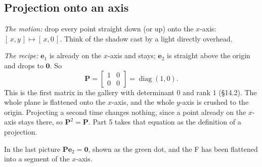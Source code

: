 \documentclass[11pt]{article}
\theoremstyle{plain}
\theoremstyle{definition}
\theoremstyle{remark}
\newcommand{\vc}[1]{\mathbf{#1}}
\newcommand{\mt}[1]{\mathbf{#1}}
\DeclareMathOperator{\diagop}{diag}
\newcommand{\Fshape}{(0.15,0.1) -- (0.35,0.1) -- (0.35,0.45) -- (0.65,0.45)
  -- (0.65,0.6) -- (0.35,0.6) -- (0.35,0.75) -- (0.8,0.75) -- (0.8,0.9)
  -- (0.15,0.9) -- cycle}
\newcommand{\actionpic}[4]{%
  \begin{scope}
    \clip (-2.2,-2.2) rectangle (2.4,2.4);
    \draw[step=1cm,gray!22,very thin] (-3,-3) grid (3,3);
  \end{scope}
  \draw[axisline] (-2.2,0) -- (2.6,0);
  \draw[axisline] (0,-2.2) -- (0,2.6);
  \draw[gray!55,dashed] (0,0) -- (1,0) -- (1,1) -- (0,1) -- cycle;
  \fill[gray!30] \Fshape;
  \begin{scope}[cm={#1,#3,#2,#4,(0,0)}]
    \fill[RoyalBlue!15] (0,0) -- (1,0) -- (1,1) -- (0,1) -- cycle;
    \draw[RoyalBlue!60] (0,0) -- (1,0) -- (1,1) -- (0,1) -- cycle;
    \fill[RoyalBlue!75] \Fshape;
  \end{scope}}
\newcommand{\eone}[2]{\draw[vecarr,BrickRed] (0,0) -- (#1,#2);}
\newcommand{\etwo}[2]{\draw[vecarr,ForestGreen] (0,0) -- (#1,#2);}
\newcommand{\piclabel}[1]{\node[font=\small,align=center,anchor=north] at (0.1,-2.45) {#1};}
\begin{document}
\subsection{Projection onto an axis}
\emph{The motion:} drop every point straight down (or up) onto the $x$-axis:
$[\,x,y\,]\mapsto[\,x,0\,]$. Think of the shadow cast by a light directly
overhead.

\emph{The recipe:} $\vc{e}_1$ is already on the $x$-axis and stays;
$\vc{e}_2$ is straight above the origin and drops to $\vc{0}$. So
\[
  \mt{P}=\begin{bmatrix}1&0\\0&0\end{bmatrix}=\diagop(1,0) .
\]
This is the first matrix in the gallery with determinant $0$ and rank $1$
(\S14.2). The whole plane is flattened onto the $x$-axis, and the whole $y$-axis
is crushed to the origin. Projecting a second time changes nothing, since a
point already on the $x$-axis stays there, so $\mt{P}^{2}=\mt{P}$. Part 5 takes
that equation as the definition of a projection.

\begin{center}
\end{center}

\noindent In the last picture $\mt{P}\vc{e}_2=\vc{0}$, shown as the green dot,
and the F has been flattened into a segment of the $x$-axis.
\end{document}
